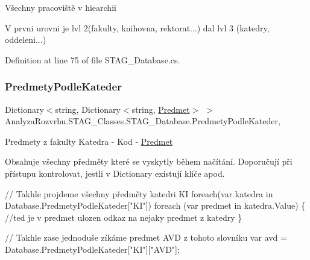 Všechny pracoviště v hiearchii 

V prvni urovni je lvl 2(fakulty, knihovna, rektorat...) dal lvl 3 (katedry, oddeleni...)

Definition at line 75 of file S\+T\+A\+G\+\_\+\+Database.\+cs.

\mbox{\label{class_analyza_rozvrhu_1_1_s_t_a_g___classes_1_1_s_t_a_g___database_ad3a541091f338a9ed628cc889ddc01f0}} 
\subsubsection{\texorpdfstring{Predmety\+Podle\+Kateder}{PredmetyPodleKateder}}
{\footnotesize\ttfamily Dictionary$<$string, Dictionary$<$string, \hyperlink{class_analyza_rozvrhu_1_1_s_t_a_g___classes_1_1_predmet}{Predmet}$>$ $>$ Analyza\+Rozvrhu.\+S\+T\+A\+G\+\_\+\+Classes.\+S\+T\+A\+G\+\_\+\+Database.\+Predmety\+Podle\+Kateder\hspace{0.3cm}{\ttfamily [get]}, {\ttfamily [set]}}



Predmety z fakulty Katedra -\/ Kod -\/ \hyperlink{class_analyza_rozvrhu_1_1_s_t_a_g___classes_1_1_predmet}{Predmet} 

Obsahuje všechny předměty které se vyskytly během načítání. Doporučují při přístupu kontrolovat, jestli v Dictionary existují klíče apod. 


\begin{DoxyCode}
\textcolor{comment}{// Takhle projdeme všechny předměty katedri KI}
\textcolor{keywordflow}{foreach}(var katedra \textcolor{keywordflow}{in} Database.PredmetyPodleKateder[\textcolor{stringliteral}{"KI"}])
    \textcolor{keywordflow}{foreach} (var predmet \textcolor{keywordflow}{in} katedra.Value)
    \{
        \textcolor{comment}{//ted je v predmet ulozen odkaz na nejaky predmet z katedry}
    \}

\textcolor{comment}{// Takhle zase jednoduše zíkáme predmet AVD z tohoto slovníku}
var avd = Database.PredmetyPodleKateder[\textcolor{stringliteral}{"KI"}][\textcolor{stringliteral}{"AVD"}];
\end{DoxyCode}
 

